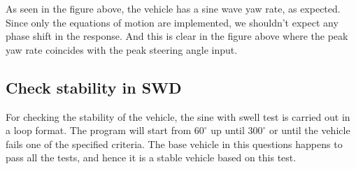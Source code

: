 As seen in the figure above, the vehicle has a sine wave yaw rate, as expected. Since only the equations of motion are implemented, we shouldn't expect any phase shift in the response. And this is clear in the figure above where the peak yaw rate coincides with the peak steering angle input.


\subsection{Check stability in SWD}
For checking the stability of the vehicle, the sine with swell test is carried out in a loop format. The program will start from $60^{\circ}$ up until $300^{\circ}$ or until the vehicle fails one of the specified criteria. The base vehicle in this questions happens to pass all the tests, and hence it is a stable vehicle based on this test.